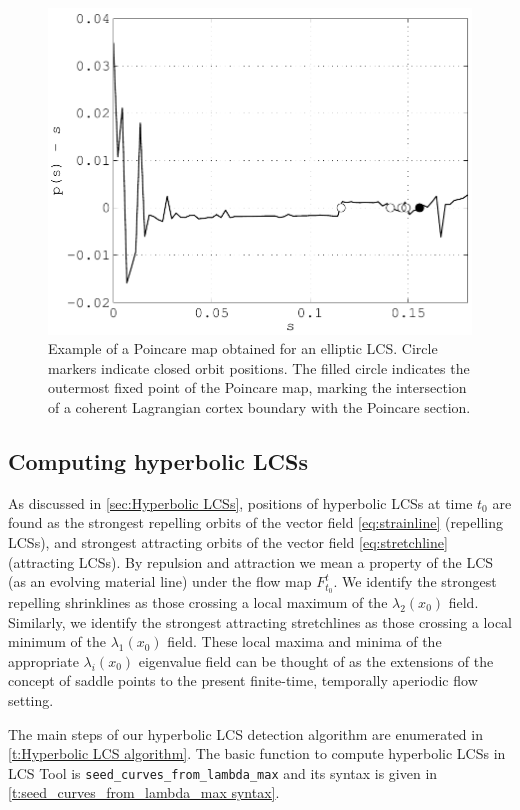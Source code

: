 \documentclass{elsarticle}
\begin{document}
\begin{figure}
\begin{center}
\includegraphics[width=.8\textwidth]{graphics/double_gyre/poincare_return_map}
\end{center}
\caption{Example of a Poincare map obtained for an elliptic LCS. Circle markers indicate closed orbit positions. The filled circle indicates the outermost fixed point of the Poincare map, marking the intersection of a coherent Lagrangian cortex boundary with the Poincare section.}
\label{f:Poincare return map}
\end{figure}

\subsection{Computing hyperbolic LCSs}

As discussed in \cref{sec:Hyperbolic LCSs}, positions of hyperbolic LCSs at time $t_0$ are found as the strongest repelling orbits of the vector field \cref{eq:strainline} (repelling LCSs), and strongest attracting orbits of the vector field \cref{eq:stretchline} (attracting LCSs). By repulsion and attraction we mean a property of the LCS (as an evolving material line) under the flow map $F_{t_0}^t$. We identify the strongest repelling shrinklines as those crossing a local maximum of the $\lambda_2(x_0)$ field. Similarly, we identify the strongest attracting stretchlines as those crossing a local minimum of the $\lambda_1(x_0)$ field. These local maxima and minima of the appropriate $\lambda_i(x_0)$ eigenvalue field can be thought of as the extensions of the concept of saddle points to the present finite-time, temporally aperiodic flow setting.

The main steps of our hyperbolic LCS detection algorithm are enumerated in \cref{t:Hyperbolic LCS algorithm}. The basic function to compute hyperbolic LCSs in LCS Tool is \lstinline!seed_curves_from_lambda_max! and its syntax is given in \cref{t:seed_curves_from_lambda_max syntax}.
\end{document}
